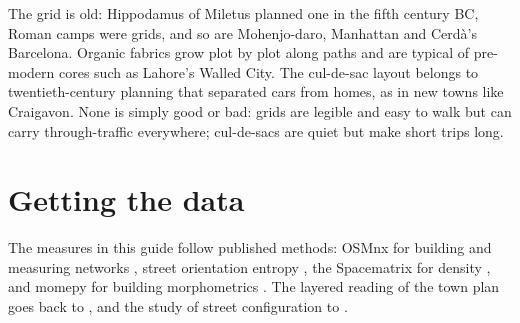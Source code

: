 The grid is old: Hippodamus of Miletus planned one in the fifth century BC, Roman camps were grids, and so are Mohenjo-daro, Manhattan and Cerd\`a's Barcelona. Organic fabrics grow plot by plot along paths and are typical of pre-modern cores such as Lahore's Walled City. The cul-de-sac layout belongs to twentieth-century planning that separated cars from homes, as in new towns like Craigavon. None is simply good or bad: grids are legible and easy to walk but can carry through-traffic everywhere; cul-de-sacs are quiet but make short trips long.

\section{Getting the data}


The measures in this guide follow published methods: OSMnx for building and measuring networks \citep{Boeing_2017,Boeing_2018}, street orientation entropy \citep{Boeing_2019}, the Spacematrix for density \citep{BerghauserPont_2010}, and momepy for building morphometrics \citep{Fleischmann_2019}. The layered reading of the town plan goes back to \citet{Conzen_1960}, and the study of street configuration to \citet{Hillier_1984}.
